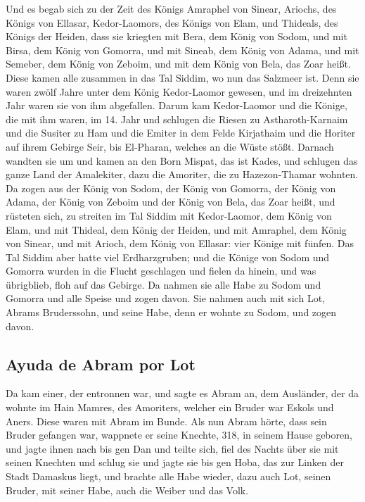  Und es begab sich zu der Zeit des Königs Amraphel von
Sinear, Ariochs, des Königs von Ellasar, Kedor-Laomors, des Königs von
Elam, und Thideals, des Königs der Heiden,  dass sie
kriegten mit Bera, dem König von Sodom, und mit Birsa, dem König von
Gomorra, und mit Sineab, dem König von Adama, und mit Semeber, dem König
von Zeboim, und mit dem König von Bela, das Zoar heißt. 
Diese kamen alle zusammen in das Tal Siddim, wo nun das Salzmeer ist.
 Denn sie waren zwölf Jahre unter dem König Kedor-Laomor
gewesen, und im dreizehnten Jahr waren sie von ihm abgefallen.
 Darum kam Kedor-Laomor und die Könige, die mit ihm waren,
im 14. Jahr und schlugen die Riesen zu Astharoth-Karnaim und die Susiter
zu Ham und die Emiter in dem Felde Kirjathaim  und die
Horiter auf ihrem Gebirge Seir, bis El-Pharan, welches an die Wüste
stößt.  Darnach wandten sie um und kamen an den Born
Mispat, das ist Kades, und schlugen das ganze Land der Amalekiter, dazu
die Amoriter, die zu Hazezon-Thamar wohnten.  Da zogen aus
der König von Sodom, der König von Gomorra, der König von Adama, der
König von Zeboim und der König von Bela, das Zoar heißt, und rüsteten
sich, zu streiten im Tal Siddim  mit Kedor-Laomor, dem
König von Elam, und mit Thideal, dem König der Heiden, und mit Amraphel,
dem König von Sinear, und mit Arioch, dem König von Ellasar: vier Könige
mit fünfen.  Das Tal Siddim aber hatte viel
Erdharzgruben; und die Könige von Sodom und Gomorra wurden in die Flucht
geschlagen und fielen da hinein, und was übrigblieb, floh auf das
Gebirge.  Da nahmen sie alle Habe zu Sodom und Gomorra
und alle Speise und zogen davon.  Sie nahmen auch mit
sich Lot, Abrams Bruderssohn, und seine Habe, denn er wohnte zu Sodom,
und zogen davon.

\hypertarget{ayuda-de-abram-por-lot}{%
\subsection{Ayuda de Abram por Lot}\label{ayuda-de-abram-por-lot}}

 Da kam einer, der entronnen war, und sagte es Abram an,
dem Ausländer, der da wohnte im Hain Mamres, des Amoriters, welcher ein
Bruder war Eskols und Aners. Diese waren mit Abram im Bunde.
 Als nun Abram hörte, dass sein Bruder gefangen war,
wappnete er seine Knechte, 318, in seinem Hause geboren, und jagte ihnen
nach bis gen Dan  und teilte sich, fiel des Nachts über
sie mit seinen Knechten und schlug sie und jagte sie bis gen Hoba, das
zur Linken der Stadt Damaskus liegt,  und brachte alle
Habe wieder, dazu auch Lot, seinen Bruder, mit seiner Habe, auch die
Weiber und das Volk.


